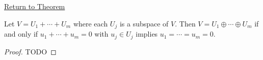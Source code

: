\newpage
{}
\label{prf:condition-for-direct-sum}

\begin{remark*}[Return]
\hyperref[thm:condition-for-direct-sum]{Return to Theorem}
\end{remark*}

\begin{theorem*}
Let $V = U_1+\cdots+U_m$ where each $U_j$ is a subspace of $V$.
Then $V = U_1\oplus\cdots\oplus U_m$ if and only if
$u_1+\cdots+u_m = 0$ with $u_j \in U_j$ implies $u_1 = \cdots = u_m = 0$.
\end{theorem*}

\begin{proof}
TODO
\end{proof}
